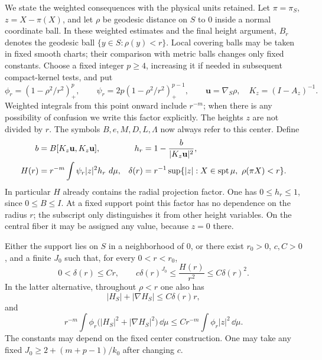 We state the weighted consequences with the physical units retained.
Let $\pi=\pi_S$, $z=X-\pi(X)$, and let $\rho$ be geodesic distance
on $S$ to $0$ inside a normal coordinate ball. In these weighted
estimates and the final height argument, $B_r$ denotes the geodesic
ball $\{y\in S:\rho(y)<r\}$. Local covering balls may be taken
in fixed smooth charts; their comparison with metric balls changes
only fixed constants. Choose a fixed integer
$p\ge4$, increasing it if needed in subsequent compact-kernel tests,
and put
\begin{equation}
 \label{ce:kernel}
 \phi_r=(1-\rho^2/r^2)_+^p,
 \qquad \psi_r=2p(1-\rho^2/r^2)_+^{p-1},
 \qquad \mathbf u=\nabla_S\rho,\quad K_z=(I-A_z)^{-1}.
\end{equation}
Weighted integrals from this point onward include $r^{-m}$; when
there is any possibility of confusion we write this factor explicitly.
The heights $z$ are not divided by $r$.  The symbols $B,e,M,D,L,\Lambda$
now always refer to this center.  Define
\begin{equation}
 \label{ce:radialheight}
 \begin{aligned}
 b&=B[K_z\mathbf u,K_z\mathbf u],
 &h_r&=1-\frac b{|K_z\mathbf u|^2},\\
 H(r)&=r^{-m}\int\psi_r|z|^2h_r\,\mathop{}\!d\mu,
 &\delta(r)&=r^{-1}\sup\{|z|:X\in\operatorname{spt}\mu,\ \rho(\pi X)<r\}.
 \end{aligned}
\end{equation}
In particular $H$ already contains the radial projection factor.
One has $0\le h_r\le1$, since $0\le B\le I$.  At a fixed support
point this factor has no dependence on the radius $r$; the subscript
only distinguishes it from other height variables.  On the central
fiber it may be assigned any value, because $z=0$ there.

\begin{proposition}
 \label{ce:weights}
Either the support lies on $S$ in a neighborhood of $0$, or there
exist $r_0>0$, $c,C>0$, and a finite $J_0$ such that, for every
$0<r<r_0$,
\begin{equation}
 \label{ce:height}
 0<\delta(r)\le Cr,
 \qquad c\delta(r)^{J_0}\le\frac{H(r)}{r^2}
                         \le C\delta(r)^2.
\end{equation}
In the latter alternative, throughout $\rho<r$ one also has
\begin{equation}
 \label{ce:pointwisecurvature}
 |H_S|+|\nabla H_S|\le C\delta(r)r,
\end{equation}
and
\begin{equation}
 \label{ce:curvature}
 r^{-m}\int\phi_r\bigl(|H_S|^2+|\nabla H_S|^2\bigr)\,\dd\mu
       \le C r^{-m}\int\phi_r|z|^2\,\dd\mu.
\end{equation}
The constants may depend on the fixed center construction.  One may
take any fixed $J_0\ge2+(m+p-1)/k_0$ after changing $c$.
\end{proposition}

